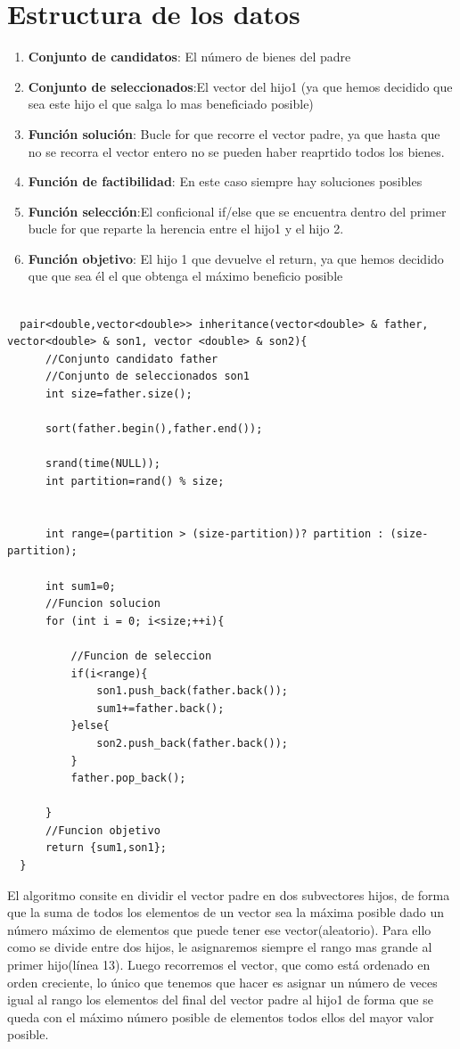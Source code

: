 \documentclass[11pt,openany]{book}
\begin{document}
\section{Estructura de los datos}
\begin{enumerate}
      \item \textbf{Conjunto de candidatos}: El número de bienes del padre
      \item \textbf{Conjunto de seleccionados}:El vector del hijo1 (ya que hemos decidido
      que sea este hijo el que salga lo mas beneficiado posible)
      \item \textbf{Función solución}: Bucle for que recorre el vector padre, ya que hasta que no 
      se recorra el vector entero no se pueden haber reaprtido todos los bienes. 
      \item \textbf{Función de factibilidad}: En este caso siempre hay soluciones posibles
      \item \textbf{Función selección}:El conficional if/else que se encuentra dentro del primer bucle for que reparte
      la herencia entre el hijo1 y el hijo 2.
      \item \textbf{Función objetivo}: El hijo 1 que devuelve el return, ya que hemos decidido que
      que sea él el que obtenga el máximo beneficio posible
\end{enumerate}
\begin{lstlisting}

  pair<double,vector<double>> inheritance(vector<double> & father, vector<double> & son1, vector <double> & son2){
      //Conjunto candidato father
      //Conjunto de seleccionados son1
      int size=father.size();
  
      sort(father.begin(),father.end());
  
      srand(time(NULL));
      int partition=rand() % size;
  
      
      int range=(partition > (size-partition))? partition : (size-partition);
  
      int sum1=0;
      //Funcion solucion
      for (int i = 0; i<size;++i){
          
          //Funcion de seleccion
          if(i<range){
              son1.push_back(father.back());
              sum1+=father.back();
          }else{
              son2.push_back(father.back());
          }
          father.pop_back();
          
      }
      //Funcion objetivo
      return {sum1,son1};
  }
\end{lstlisting}
El algoritmo consite en dividir el vector padre en dos subvectores hijos, de forma que
la suma de todos los elementos de un vector sea la máxima posible dado un número máximo
de elementos que puede tener ese vector(aleatorio). Para ello como se divide entre dos hijos,
le asignaremos siempre el rango mas grande al primer hijo(línea 13). Luego recorremos el vector,
que como está ordenado en orden creciente, lo único que tenemos que hacer es asignar un número de 
veces igual al rango los elementos del final del vector padre al hijo1 de forma que se queda con 
el máximo número posible de elementos todos ellos del mayor valor posible.
\end{document}
